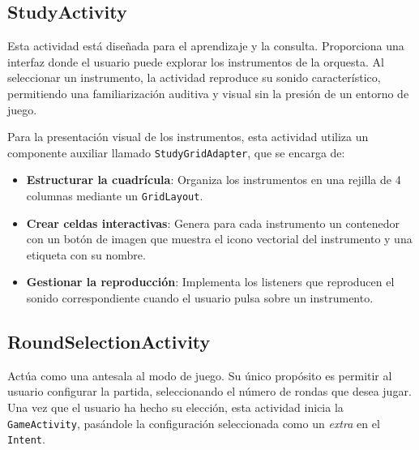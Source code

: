 \documentclass{article}
\newcommand{\iconpath}{/home/khz/git/tabler-icons/icons/outline-white/}
\newcommand{\icon}[1]{}
\begin{document}
\subsection{StudyActivity \icon{book}}
Esta actividad está diseñada para el aprendizaje y la consulta. Proporciona una interfaz donde el usuario puede explorar los instrumentos de la orquesta. Al seleccionar un instrumento, la actividad reproduce su sonido característico, permitiendo una familiarización auditiva y visual sin la presión de un entorno de juego.

Para la presentación visual de los instrumentos, esta actividad utiliza un componente auxiliar llamado \texttt{StudyGridAdapter}, que se encarga de:
\begin{itemize}
    \item \textbf{Estructurar la cuadrícula}: Organiza los instrumentos en una rejilla de 4 columnas mediante un \texttt{GridLayout}.
    \item \textbf{Crear celdas interactivas}: Genera para cada instrumento un contenedor con un botón de imagen que muestra el icono vectorial del instrumento y una etiqueta con su nombre.
    \item \textbf{Gestionar la reproducción}: Implementa los listeners que reproducen el sonido correspondiente cuando el usuario pulsa sobre un instrumento.
\end{itemize}

\subsection{RoundSelectionActivity \icon{list}}
Actúa como una antesala al modo de juego. Su único propósito es permitir al usuario configurar la partida, seleccionando el número de rondas que desea jugar. Una vez que el usuario ha hecho su elección, esta actividad inicia la \texttt{GameActivity}, pasándole la configuración seleccionada como un \textit{extra} en el \texttt{Intent}.
\end{document}
